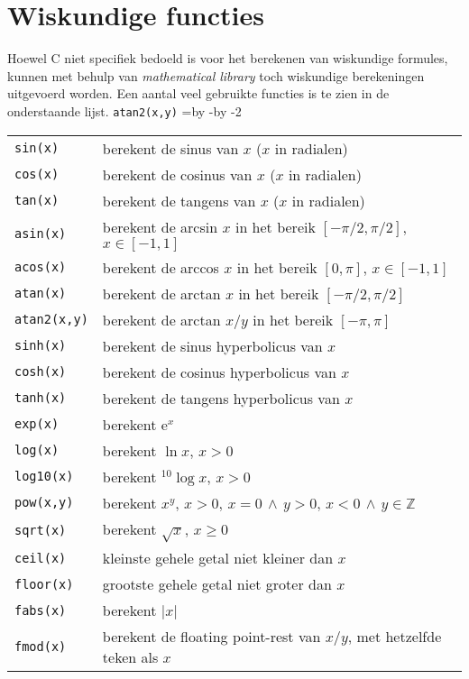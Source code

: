 \section{Wiskundige functies}
Hoewel C niet specifiek bedoeld is voor het berekenen van wiskundige formules, kunnen met behulp van \textsl{mathematical library} toch wiskundige berekeningen uitgevoerd worden. Een aantal veel gebruikte functies is te zien in de onderstaande lijst.
\hbox{\texttt{atan2(x,y)}}
\newdimen\delengteb\delengteb=\textwidth\advance\delengteb by -\advance\delengteb by -2\tabcolsep
\begin{table}[!ht]
\centering
\begin{tabular}{lp{\delengteb}}
\texttt{sin(x)} & berekent de sinus van $x$ ($x$ in radialen)\\
\texttt{cos(x)} & berekent de cosinus van $x$ ($x$ in radialen)\\
\texttt{tan(x)} & berekent de tangens van $x$ ($x$ in radialen)\\
\texttt{asin(x)} & berekent de arcsin $x$ in het bereik $[-\pi/2, \pi/2]$,  $x\in [-1,1]$\\
\texttt{acos(x)} & berekent de arccos $x$ in het bereik $[0, \pi]$,  $x\in [-1,1]$\\
\texttt{atan(x)} & berekent de arctan $x$ in het bereik $[-\pi/2, \pi/2]$\\
\texttt{atan2(x,y)} & berekent de arctan $x/y$ in het bereik $[-\pi, \pi]$\\
\texttt{sinh(x)} & berekent de sinus hyperbolicus van $x$\\
\texttt{cosh(x)} & berekent de cosinus hyperbolicus van $x$\\
\texttt{tanh(x)} & berekent de tangens hyperbolicus van $x$\\
\texttt{exp(x)} & berekent $\mathrm{e}^x$\\
\texttt{log(x)} & berekent $\ln x$, $x>0$\\
\texttt{log10(x)} & berekent $^{10}\!\log x$, $x>0$\\
\texttt{pow(x,y)} & berekent $x^y$, $x>0,\,x=0\,\wedge\,y>0,\,x<0\,\wedge\,y\in\mathbb{Z}$\\
\texttt{sqrt(x)} & berekent $\sqrt{x}$, $x\geq0$\\
\texttt{ceil(x)} & kleinste gehele getal niet kleiner dan $x$\\
\texttt{floor(x)} & grootste gehele getal niet groter dan $x$\\
\texttt{fabs(x)} & berekent $|x|$\\
\texttt{fmod(x)} & berekent de floating point-rest van $x/y$, met hetzelfde teken als $x$\\
\end{tabular}
\end{table}

